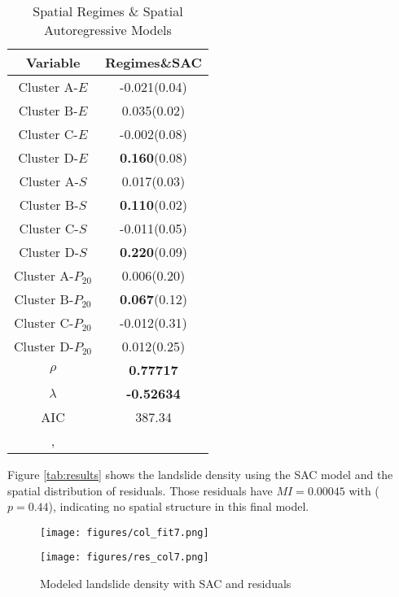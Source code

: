 \documentclass[
  manuscript=article,  
  layout=preprint,  
  year=2023,
  volume=0,
]{format}
\begin{document}
\begin{table}[htbp]\centering
\caption{Spatial Regimes \& Spatial Autoregressive Models}
\label{tab:splag}
\begin{tabular}{c c}
\toprule
\textbf{Variable} & \textbf{Regimes\&SAC}\\ 
\midrule
Cluster A-$E$&-0.021(0.04)\\
Cluster B-$E$&0.035(0.02)\\
Cluster C-$E$&-0.002(0.08)\\
Cluster D-$E$&\textbf{0.160}(0.08)\\
Cluster A-$S$&0.017(0.03)\\
Cluster B-$S$&\textbf{0.110}(0.02) \\
Cluster C-$S$&-0.011(0.05)\\
Cluster D-$S$&\textbf{0.220}(0.09)\\
Cluster A-$P_{20}$&0.006(0.20)\\
Cluster B-$P_{20}$&\textbf{0.067}(0.12)\\
Cluster C-$P_{20}$&-0.012(0.31)\\
Cluster D-$P_{20}$&0.012(0.25)\\
\midrule
$\rho$&\textbf{0.77717} \\          
$\lambda$&\textbf{-0.52634} \\
AIC&387.34   \\
\bottomrule
\addlinespace[1ex]
\multicolumn{1}{l}{\textbf{$p<0.05$}}, 
\end{tabular}
\end{table}

\par Figure \ref{tab:results} shows the landslide density using the SAC model and the spatial distribution of residuals. Those residuals have $MI = 0.00045$ with ($p = 0.44$), indicating no spatial structure in this final model.

\begin{figure}[ht!]
  \begin{minipage}{.48\linewidth}
    \centering
      {\texttt{[image: figures/col\_fit7.png]}}
  \end{minipage}\quad
  \begin{minipage}{.48\linewidth}
    \centering
      {\texttt{[image: figures/res\_col7.png]}}
  \end{minipage}
    \caption{Modeled landslide density with SAC and residuals}
    \label{fig:results}
\end{figure}
\end{document}
